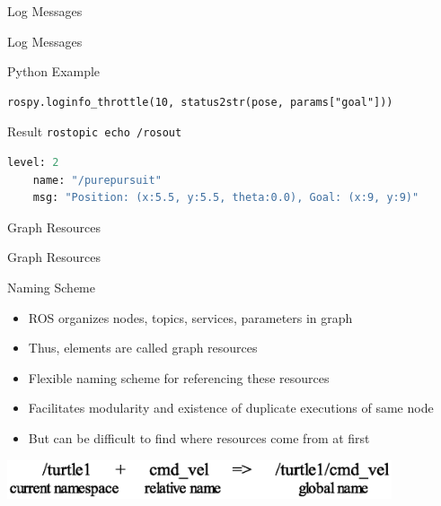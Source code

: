 \documentclass[9pt]{beamer}
\begin{document}
\begin{section}{Log Messages}
\begin{frame}[fragile]{Log Messages}
        \begin{block}{Python Example}
            \begin{verbatim}
rospy.loginfo_throttle(10, status2str(pose, params["goal"]))
            \end{verbatim}
        \end{block}
        \begin{block}{Result}
        \lstinline{rostopic echo /rosout}
            \begin{lstlisting}[language=Python]
    level: 2
    name: "/purepursuit"
    msg: "Position: (x:5.5, y:5.5, theta:0.0), Goal: (x:9, y:9)"
            \end{lstlisting}
        \end{block}
    \end{frame}
\end{section}





\begin{section}{Graph Resources}
    \begin{frame}{Graph Resources}
        \begin{block}{Naming Scheme}
            \begin{itemize}
                \item ROS organizes nodes, topics, services, parameters in graph
                \item Thus, elements are called graph resources
                \item Flexible naming scheme for referencing these resources
                \item Facilitates modularity and existence of duplicate executions of same node
                \item But can be difficult to find where resources come from at first
            \end{itemize}
             \begin{center}
                \includegraphics[width=0.85\textwidth,trim={0cm 0cm 0cm 0cm},clip]{img/ros_names.eps}
            \end{center}
        \end{block}
    \end{frame}
\end{section}
\end{document}
